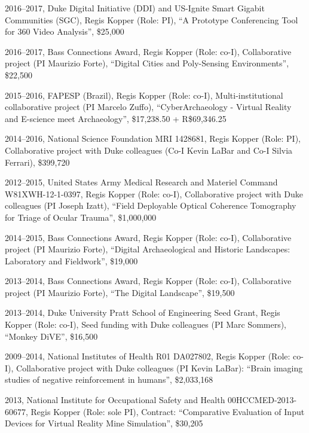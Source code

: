 \documentclass[wideaddress]{vitae}
\let\olditem\item
\def\item{\nopagebreak[4]\olditem}%
\begin{document}
\begin{etaremune}
 	\item{2016--2017, Duke Digital Initiative (DDI) and US-Ignite Smart Gigabit Communities (SGC), Regis Kopper (Role: PI), ``A Prototype Conferencing Tool for 360\textdegree{} Video Analysis'', \$25,000}
	\item{2016--2017, Bass Connections Award, Regis Kopper (Role: co-I), Collaborative project (PI Maurizio Forte), ``Digital Cities and Poly-Sensing Environments'', \$22,500}
	\item{2015--2016, FAPESP (Brazil), Regis Kopper (Role: co-I), Multi-institutional collaborative project (PI Marcelo Zuffo), ``CyberArchaeology - Virtual Reality and E-science meet Archaeology'', \$17,238.50 + R\$69,346.25}
	\item{2014--2016, National Science Foundation MRI 1428681, Regis Kopper (Role: PI), Collaborative project with Duke colleagues (Co-I Kevin LaBar and Co-I Silvia Ferrari), \$399,720}
	\item{2012--2015, United States Army Medical Research and Materiel Command W81XWH-12-1-0397, Regis Kopper (Role: co-I), Collaborative project with Duke colleagues (PI Joseph Izatt), ``Field Deployable Optical Coherence Tomography for Triage of Ocular Trauma'', \$1,000,000}
	\item{2014--2015, Bass Connections Award, Regis Kopper (Role: co-I), Collaborative project (PI Maurizio Forte), ``Digital Archaeological and Historic Landscapes: Laboratory and Fieldwork'', \$19,000}
	\item{2013--2014, Bass Connections Award, Regis Kopper (Role: co-I), Collaborative project (PI Maurizio Forte), ``The Digital Landscape'', \$19,500}
	\item{2013--2014, Duke University Pratt School of Engineering Seed Grant, Regis Kopper (Role: co-I), Seed funding with Duke colleagues (PI Marc Sommers), ``Monkey DiVE'', \$16,500}
	\item{2009--2014, National Institutes of Health R01 DA027802, Regis Kopper (Role: co-I), Collaborative project with Duke colleagues (PI Kevin LaBar): ``Brain imaging studies of negative reinforcement in humans'', \$2,033,168}
	\item{2013, National Institute for Occupational Safety and Health 00HCCMED-2013-60677, Regis Kopper (Role: sole PI), Contract: ``Comparative Evaluation of Input Devices for Virtual Reality Mine Simulation'', \$30,205}
\end{etaremune}


\end{document}
